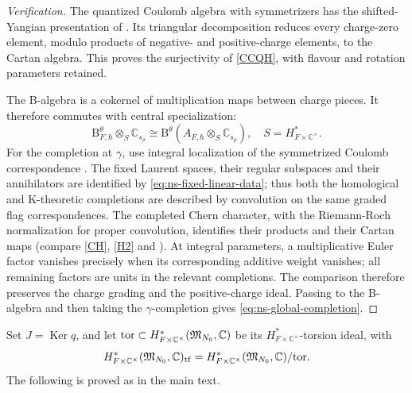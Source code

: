 \documentclass[11pt,reqno]{amsart}
\theoremstyle{definition}
\theoremstyle{remark}
\def\bbC{\mathbb C}
\def\B{\mathrm B}
\def\Ker{\operatorname{Ker}}
\begin{document}
\begin{proof}[Verification]
The quantized Coulomb algebra with symmetrizers has the
shifted-Yangian presentation of \cite{NW23}. Its triangular
decomposition reduces every charge-zero element, modulo products
of negative- and positive-charge elements, to the Cartan algebra.
This proves the surjectivity of \eqref{CCQH}, with flavour and
rotation parameters retained.

The B-algebra is a cokernel of multiplication maps between charge
pieces. It therefore commutes with central specialization:
\[
 \B^\theta_{F,\hbar}\otimes_S\bbC_{s_\rho}
 \cong\B^\theta(A_{F,\hbar}\otimes_S\bbC_{s_\rho}),
 \quad S=H^*_{F\times\bbC^\times}.
\]
For the completion at $\gamma$, use integral localization of the
symmetrized Coulomb correspondence \cite{NW23,VV25,VVsh}.
The fixed Laurent spaces, their regular subspaces and their
annihilators are identified by \eqref{eq:ns-fixed-linear-data};
thus both the homological and K-theoretic completions are described
by convolution on the same graded flag correspondences. The
completed Chern character, with the Riemann-Roch normalization
for proper convolution, identifies their products and their Cartan
maps (compare \eqref{CH}, \eqref{H2} and \cite{DK25}).
At integral parameters, a multiplicative Euler factor vanishes
precisely when its corresponding additive weight vanishes;
all remaining factors are units in the relevant completions.
The comparison therefore preserves the charge grading and the
positive-charge ideal. Passing to the B-algebra and then taking the
$\gamma$-completion gives \eqref{eq:ns-global-completion}.
\end{proof}
\fi%
Set $J=\Ker q$, and let ${\rm tor}\subset H^*_{F\times\bbC^\times}(\mathfrak M_{N_0},\bbC)$ 
be its ${H^*_{F\times\bbC^\times}}$-torsion
ideal, with 
$$H^*_{F\times\bbC^\times}(\mathfrak M_{N_0},\bbC)_{\rm tf}=H^*_{F\times\bbC^\times}(\mathfrak M_{N_0},\bbC)/{\rm tor}.$$
The following is proved as in the main text.
\end{document}
